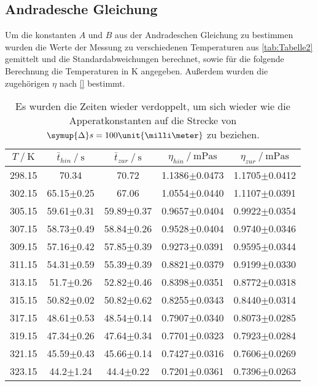 \subsection{Andradesche Gleichung}
Um die konstanten $A$ und $B$ aus der Andradeschen Gleichung zu bestimmen wurden die Werte der Messung zu verschiedenen Temperaturen aus \autoref{tab:Tabelle2}
gemittelt und die Standardabweichungen berechnet, sowie für die folgende
Berechnung die Temperaturen in $\unit{\kelvin}$ angegeben. Außerdem wurden die zugehörigen $\eta$ nach \eqref{} bestimmt.
\begin{table}[H]
  \centering
  \caption{Es wurden die Zeiten wieder verdoppelt, um sich wieder wie die Apperatkonstanten auf die Strecke von $\symup{\Delta}s=100\unit{\milli\meter}$ zu beziehen.}
  \begin{tabular}{ccccc}
    \toprule
    {$T \mathbin{/} \unit{\kelvin}$} &
    {$\bar{t}_{hin} \mathbin{/} \unit{\second}$} &
    {$\bar{t}_{zur} \mathbin{/} \unit{\second}$} &
    {$\eta_{hin} \mathbin{/} \unit{\milli\pascal\second}$} &
    {$\eta_{zur} \mathbin{/} \unit{\milli\pascal\second}$} \\
    \midrule
    298.15 & 70.34          & 70.72          & 1.1386$\pm$0.0473 & 1.1705$\pm$0.0412 \\
    302.15 & 65.15$\pm$0.25 & 67.06          & 1.0554$\pm$0.0440 & 1.1107$\pm$0.0391 \\
    305.15 & 59.61$\pm$0.31 & 59.89$\pm$0.37 & 0.9657$\pm$0.0404 & 0.9922$\pm$0.0354 \\
    307.15 & 58.73$\pm$0.49 & 58.84$\pm$0.26 & 0.9528$\pm$0.0404 & 0.9740$\pm$0.0346 \\
    309.15 & 57.16$\pm$0.42 & 57.85$\pm$0.39 & 0.9273$\pm$0.0391 & 0.9595$\pm$0.0344 \\
    311.15 & 54.31$\pm$0.59 & 55.39$\pm$0.39 & 0.8821$\pm$0.0379 & 0.9199$\pm$0.0330 \\
    313.15 & 51.7$\pm$0.26  & 52.82$\pm$0.46 & 0.8398$\pm$0.0351 & 0.8772$\pm$0.0318 \\
    315.15 & 50.82$\pm$0.02 & 50.82$\pm$0.62 & 0.8255$\pm$0.0343 & 0.8440$\pm$0.0314 \\
    317.15 & 48.61$\pm$0.53 & 48.54$\pm$0.14 & 0.7907$\pm$0.0340 & 0.8073$\pm$0.0285 \\
    319.15 & 47.34$\pm$0.26 & 47.64$\pm$0.34 & 0.7701$\pm$0.0323 & 0.7923$\pm$0.0284 \\
    321.15 & 45.59$\pm$0.43 & 45.66$\pm$0.14 & 0.7427$\pm$0.0316 & 0.7606$\pm$0.0269 \\
    323.15 & 44.2$\pm$1.24  & 44.4$\pm$0.22  & 0.7201$\pm$0.0361 & 0.7396$\pm$0.0263 \\
    \bottomrule
  \end{tabular}
  \label{tab:Tabelle3}
\end{table}
